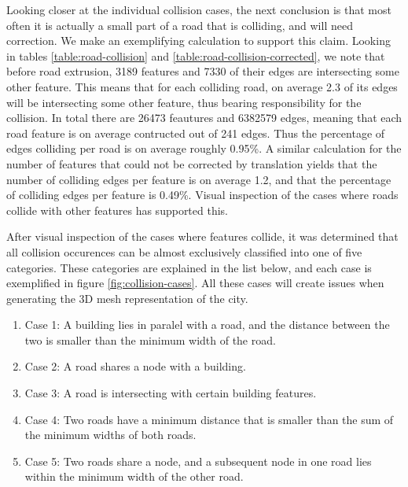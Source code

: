 \documentclass{kththesis}
\begin{document}
Looking closer at the individual collision cases, the next conclusion is that most often it is actually a small part of a road that is colliding, and will need correction.
We make an exemplifying calculation to support this claim.
Looking in tables \ref{table:road-collision} and \ref{table:road-collision-corrected}, we note that before road extrusion, 3189 features and 7330 of their edges are intersecting some other feature.
This means that for each colliding road, on average 2.3 of its edges will be intersecting some other feature, thus bearing responsibility for the collision.
In total there are 26473 feautures and 6382579 edges, meaning that each road feature is on average contructed out of 241 edges.
Thus the percentage of edges colliding per road is on average roughly 0.95\%.
A similar calculation for the number of features that could not be corrected by translation yields that the number of colliding edges per feature is on average 1.2, and that the percentage of colliding edges per feature is 0.49\%.
Visual inspection of the cases where roads collide with other features has supported this.

After visual inspection of the cases where features collide, it was determined that all collision occurences can be almost exclusively classified into one of five categories.
These categories are explained in the list below, and each case is exemplified in figure \ref{fig:collision-cases}.
All these cases will create issues when generating the 3D mesh representation of the city.

\begin{enumerate}
\item Case 1: A building lies in paralel with a road, and the distance between the two is smaller than the minimum width of the road.
\item Case 2: A road shares a node with a building.
\item Case 3: A road is intersecting with certain building features.
\item Case 4: Two roads have a minimum distance that is smaller than the sum of the minimum widths of both roads. 
\item Case 5: Two roads share a node, and a subsequent node in one road lies within the minimum width of the other road.
\end{enumerate}
\end{document}
